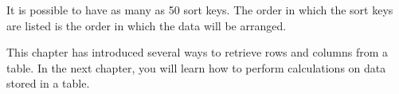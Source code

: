 It is possible to have as many as 50 sort
keys.  The order in which the sort keys are listed is the order in
which the data will be arranged.
%
%
%
%
%

This chapter has introduced several ways to retrieve rows and columns
from a table.  In the next chapter, you will learn how to perform
calculations on data stored in a table.

